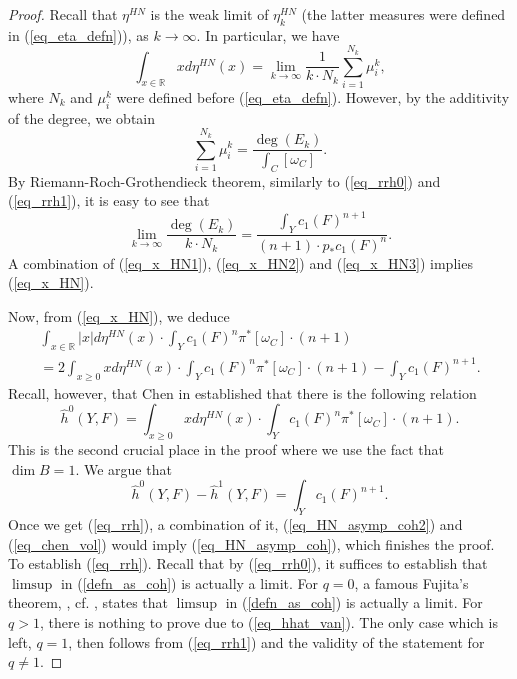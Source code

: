 \documentclass[12pt]{article}
\numberwithin{equation}{section}
\theoremstyle{theorem}
\theoremstyle{definition}
\theoremstyle{remark}
\newcommand{\real}{\mathbb{R}}
\begin{document}
\begin{proof}
		Recall that $\eta^{HN}$ is the weak limit of $\eta^{HN}_k$ (the latter measures were defined in (\ref{eq_eta_defn})), as $k \to \infty$. In particular, we have
		\begin{equation}\label{eq_x_HN1}
			\int_{x \in \real} x d \eta^{HN}(x)
			=
			\lim_{k \to \infty}
			\frac{1}{k \cdot N_k} \sum_{i = 1}^{N_k}  \mu_i^k,
		\end{equation}
		where $N_k$ and $\mu_i^k$ were defined before (\ref{eq_eta_defn}).
		However, by the additivity of the degree, we obtain 
		\begin{equation}\label{eq_x_HN2}
			\sum_{i = 1}^{N_k}  \mu_i^k
			=
			\frac{\deg(E_k)}{\int_C [\omega_C]}.
		\end{equation}
		By Riemann-Roch-Grothendieck theorem, similarly to (\ref{eq_rrh0}) and (\ref{eq_rrh1}), it is easy to see that
		\begin{equation}\label{eq_x_HN3}
			\lim_{k \to \infty} \frac{\deg(E_k)}{k \cdot N_k}
			=
			\frac{\int_Y c_1(F)^{n + 1}}{(n + 1) \cdot p_* c_1(F)^n}
			.
		\end{equation}
		A combination of (\ref{eq_x_HN1}), (\ref{eq_x_HN2}) and (\ref{eq_x_HN3}) implies (\ref{eq_x_HN}).
		\par 
		Now, from (\ref{eq_x_HN}), we deduce
		\begin{multline}\label{eq_HN_asymp_coh2}
			\int_{x \in \real} |x| d \eta^{HN}(x)
			\cdot
			\int_Y c_1(F)^n \pi^* [\omega_C]
			\cdot
			(n + 1)
			\\
			=
			2
			\int_{x \geq 0} x d \eta^{HN}(x)
			\cdot
			\int_Y c_1(F)^n \pi^* [\omega_C]
			\cdot
			(n + 1)
			-
			\int_Y c_1(F)^{n + 1}.
		\end{multline}
		Recall, however, that Chen in \cite[Theorem 1.1]{ChenVolume} established that there is the following relation
		\begin{equation}\label{eq_chen_vol}
			\hat{h}^0(Y, F)
			=
			\int_{x \geq 0} x d \eta^{HN}(x)
			\cdot
			\int_Y c_1(F)^n \pi^* [\omega_C]
			\cdot
			(n + 1).
		\end{equation}
		This is the second crucial place in the proof where we use the fact that $\dim B = 1$.
		We argue that
		\begin{equation}\label{eq_rrh}
			\hat{h}^0(Y, F) - \hat{h}^1(Y, F) = \int_Y c_1(F)^{n + 1}.
		\end{equation}
		Once we get (\ref{eq_rrh}), a combination of it, (\ref{eq_HN_asymp_coh2}) and (\ref{eq_chen_vol}) would imply (\ref{eq_HN_asymp_coh}), which finishes the proof. 
		To establish (\ref{eq_rrh}).
		Recall that by (\ref{eq_rrh0}), it suffices to establish that $\limsup$ in (\ref{defn_as_coh}) is actually a limit.
		For $q = 0$, a famous Fujita's theorem, \cite{Fujita}, cf. \cite{DemEinLaz}, states that $\limsup$ in (\ref{defn_as_coh}) is actually a limit.
		For $q > 1$, there is nothing to prove due to (\ref{eq_hhat_van}).
		The only case which is left, $q = 1$, then follows from (\ref{eq_rrh1}) and the validity of the statement for $q \neq 1$.
	\end{proof}
\end{document}
